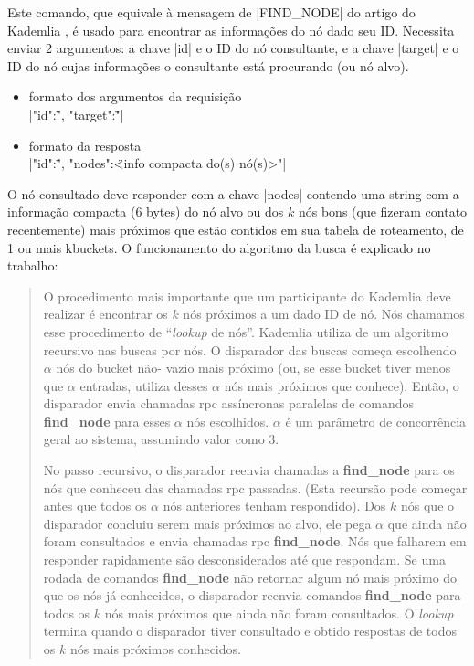 
\newpage
{}

Este comando, que equivale à mensagem de \bverb|FIND\_NODE| do artigo do Kademlia
\cite{artigo:kademlia}, é usado para encontrar as informações do nó dado seu ID.
Necessita enviar 2 argumentos: a chave \bverb|id| e o ID do nó consultante, e a chave
\bverb|target| e o ID do nó cujas informações o consultante está procurando (ou nó
alvo).

\begin{itemize}
    \item formato dos argumentos da requisição \\
        \sverb|{"id":\"<IDs dos nós consultantes>", "target":\"<ID do nó alvo>"}|

    \item formato da resposta \\
        \sverb|{"id":\"<IDs dos nós consultados>", "nodes":\"<info compacta do(s) nó(s)>"}|
\end{itemize}

O nó consultado deve responder com a chave \bverb|nodes| contendo uma
\gls*{string} com a informação compacta (6 bytes) do nó alvo ou dos $k$ nós bons (que
fizeram contato recentemente) mais próximos que estão contidos em sua tabela de
roteamento, de 1 ou mais \glspl*{kbucket}. O funcionamento do algoritmo da busca é
explicado no trabalho:

\blockquote{O procedimento mais importante que um participante do Kademlia deve realizar
é encontrar os $k$ nós próximos a um dado ID de nó. Nós chamamos esse procedimento de
\enquote{\emph{lookup} de nós}. Kademlia utiliza de um algoritmo recursivo nas buscas
por nós. O disparador das buscas começa escolhendo $\alpha$ nós do \gls*{bucket} não-
vazio mais próximo (ou, se esse \gls*{bucket} tiver menos que $\alpha$ entradas,
utiliza desses $\alpha$ nós mais próximos que conhece). Então, o disparador envia
chamadas \gls*{rpc} assíncronas paralelas de comandos \textbf{find\_node} para esses
$\alpha$ nós escolhidos. $\alpha$ é um parâmetro de concorrência geral ao sistema,
assumindo valor como 3.

No passo recursivo, o disparador reenvia chamadas a \textbf{find\_node} para os nós que
conheceu das chamadas \gls*{rpc} passadas. (Esta recursão pode começar antes que todos
os $\alpha$ nós anteriores tenham respondido). Dos $k$ nós que o disparador concluiu
serem mais próximos ao alvo, ele pega $\alpha$ que ainda não foram consultados e envia
chamadas \gls*{rpc} \textbf{find\_node}. Nós que falharem em responder rapidamente são
desconsiderados até que respondam. Se uma rodada de comandos \textbf{find\_node} não
retornar algum nó mais próximo do que os nós já conhecidos, o disparador reenvia
comandos \textbf{find\_node} para todos os $k$ nós mais próximos que ainda não foram
consultados. O \emph{lookup} termina quando o disparador tiver consultado e obtido
respostas de todos os $k$ nós mais próximos conhecidos.}

